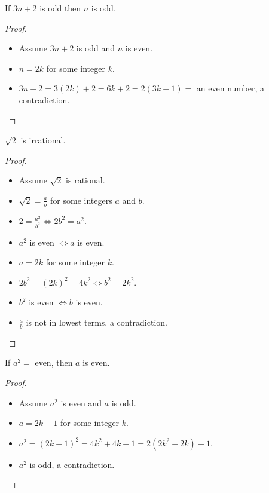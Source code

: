 \begin{claim}
    If $3n+2$ is odd then $n$ is odd.
\end{claim}

\begin{proof}
    \begin{itemize}
        \item Assume $3n+2$ is odd and $n$ is even.
        \item $n = 2k$ for some integer $k$.
        \item $3n+2 = 3(2k) + 2 = 6k + 2 = 2(3k+1) = $ an even number, a contradiction.
    \end{itemize}
\end{proof}

\begin{claim}
    $\sqrt{2}$ is irrational.
\end{claim}
\begin{proof}
    \begin{itemize}
        \item Assume $\sqrt{2}$ is rational.
        \item $\sqrt{2} = \frac{a}{b}$ for some integers $a$ and $b$.
        \item $2 = \frac{a^2}{b^2} \iff 2b^2 = a^2$.
        \item $a^2$ is even $\iff a$ is even.
        \item $a = 2k$ for some integer $k$.
        \item $2b^2 = (2k)^2 = 4k^2 \iff b^2 = 2k^2$.
        \item $b^2$ is even $\iff b$ is even.
        \item $\frac{a}{b}$ is not in lowest terms, a contradiction.
    \end{itemize}
\end{proof}

\begin{claim}
    If $a^2 = $ even, then $a$ is even.
\end{claim}
\begin{proof}
    \begin{itemize}
        \item Assume $a^2$ is even and $a$ is odd.
        \item $a = 2k+1$ for some integer $k$.
        \item $a^2 = (2k+1)^2 = 4k^2 + 4k + 1 = 2(2k^2 + 2k) + 1$.
        \item $a^2$ is odd, a contradiction.
    \end{itemize}
\end{proof}

